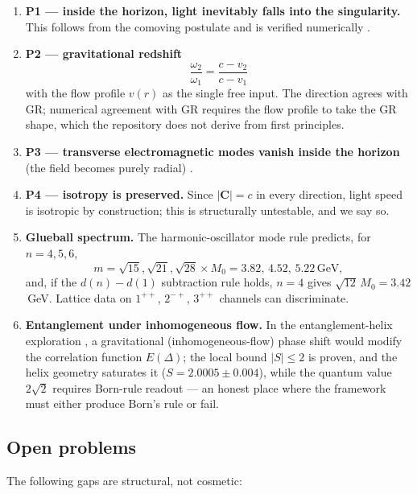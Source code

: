 \documentclass[aps,prd,preprint,superscriptaddress,amsmath,amssymb]{revtex4-2}
\begin{document}
\begin{enumerate}
  \item \textbf{P1 --- inside the horizon, light inevitably falls into the
  singularity.}  This follows from the comoving postulate and is verified
  numerically \cite{ProjectionPhysics-MF}.
  \item \textbf{P2 --- gravitational redshift}
  \begin{equation}
  \frac{\omega_2}{\omega_1} = \frac{c-v_2}{c-v_1}
  \end{equation}
  with the flow profile $v(r)$ as the single free input.  The direction
  agrees with GR; numerical agreement with GR requires the flow profile to
  take the GR shape, which the repository does not derive from first
  principles.
  \item \textbf{P3 --- transverse electromagnetic modes vanish inside the
  horizon} (the field becomes purely radial) \cite{ProjectionPhysics-MF}.
  \item \textbf{P4 --- isotropy is preserved.}  Since $|\bm{C}|=c$ in every
  direction, light speed is isotropic by construction; this is structurally
  untestable, and we say so.
  \item \textbf{Glueball spectrum.}  The harmonic-oscillator mode rule
  predicts, for $n=4,5,6$,
  \begin{equation}
  m = \sqrt{15},\sqrt{21},\sqrt{28} \times M_0 = 3.82,\,4.52,\,5.22\,\mathrm{GeV},
  \end{equation}
  and, if the $d(n)-d(1)$ subtraction rule holds, $n=4$ gives
  $\sqrt{12}\,M_0=3.42$\,GeV.  Lattice data on $1^{++}$, $2^{-+}$, $3^{++}$
  channels can discriminate.
  \item \textbf{Entanglement under inhomogeneous flow.}  In the
  entanglement-helix exploration \cite{ProjectionPhysics-helix}, a
  gravitational (inhomogeneous-flow) phase shift would modify the
  correlation function $E(\Delta)$; the local bound $|S|\leq2$ is proven,
  and the helix geometry saturates it ($S=2.0005\pm0.004$), while the
  quantum value $2\sqrt2$ requires Born-rule readout --- an honest place
  where the framework must either produce Born's rule or fail.
\end{enumerate}

\subsection{Open problems}

The following gaps are structural, not cosmetic:
\end{document}
